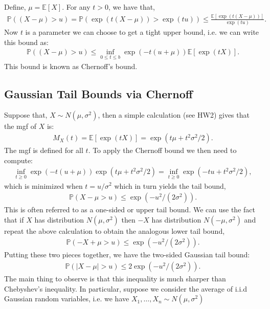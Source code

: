 \documentclass[twoside,12pt]{article}
\begin{document}
Define, $\mu = \mathbb{E}[X]$. For any $t > 0$, we have that,
\begin{align*}
\mathbb{P}((X - \mu) > u) = \mathbb{P}( \exp(t(X - \mu)) > \exp(t u) ) \leq \frac{
\mathbb{E}[\exp(t(X - \mu))]}{\exp(t u)}.
\end{align*}
Now $t$ is a parameter we can choose to get a tight upper bound, i.e. we can write this bound as:
\begin{align*}
\mathbb{P}((X - \mu) > u) \leq \inf_{0 \leq t \leq b} \exp (-t(u + \mu)) 
\mathbb{E}[\exp(tX)]. 
\end{align*}
This bound is known as Chernoff's bound.

\subsection{Gaussian Tail Bounds via Chernoff}
Suppose that, $X \sim N(\mu,\sigma^2)$, then 
a simple calculation (see HW2) gives that the mgf of $X$ is:
\begin{align*}
M_X(t) = \mathbb{E}[\exp(tX)] = \exp (t \mu + t^2 \sigma^2/2).
\end{align*}
The mgf is defined for all $t$.
To apply the Chernoff bound we then need to compute:
\begin{align*}
\inf_{t \geq 0}  \exp (-t(u + \mu)) \exp (t \mu + t^2 \sigma^2/2) = \inf_{t \geq 0} \exp ( - tu + t^2 \sigma^2/2),
\end{align*}
which is minimized when $t = u/\sigma^2$ which in turn yields the tail bound,
\begin{align*}
\mathbb{P}(X - \mu > u) \leq \exp ( -u^2 /(2 \sigma^2)).
\end{align*}
This is often referred to as a one-sided or upper tail bound. 
We can use the fact that if $X$ has distribution $N(\mu,\sigma^2)$ then $-X$ has distribution $N(-\mu, \sigma^2)$ and repeat the above calculation to obtain the analogous lower tail bound,
\begin{align*}
\mathbb{P}( -X + \mu > u) \leq \exp ( -u^2 /(2 \sigma^2)).
\end{align*}
Putting these two pieces together, we have the two-sided Gaussian tail bound:
\begin{align*}
\mathbb{P}(|X - \mu| > u) \leq 2 \exp ( -u^2 /(2 \sigma^2)).
\end{align*}
The main thing to observe is that this inequality is much sharper than 
Chebyshev's inequality. In particular, suppose we consider the average of 
i.i.d Gaussian random variables, i.e. we have $X_1,\ldots,X_n \sim N(\mu,\sigma^2)$
\end{document}
